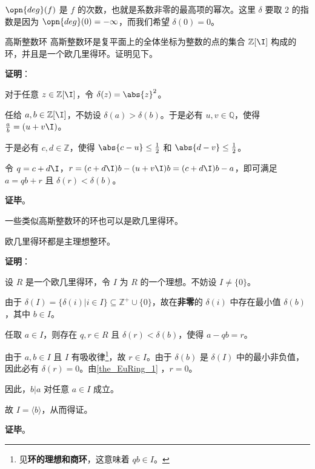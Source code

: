 $\opn{deg}(f)$ 是 $f$ 的次数，也就是系数非零的最高项的幂次。这里 $\delta$ 要取 $2$ 的指数是因为 $\opn{deg}(0)=-\infty$，而我们希望 $\delta(0)=0$。

\begin{example}{高斯整数环}
高斯整数环是复平面上的全体坐标为整数的点的集合 $\mathbb{Z}[\I]$ 构成的环，并且是一个欧几里得环。证明见下。
\end{example}

\textbf{证明}：

对于任意 $z\in\mathbb{Z}[\I]$，令 $\delta(z)=\abs{z}^2$。

任给 $a, b\in\mathbb{Z}[\I]$，不妨设 $\delta(a)>\delta(b)$。于是必有 $u, v\in\mathbb{Q}$，使得 $\frac{a}{b}=(u+v\I)$。

于是必有 $c, d\in\mathbb{Z}$，使得 $\abs{c-u}\leq\frac{1}{2}$ 和 $\abs{d-v}\leq\frac{1}{2}$。

令 $q=c+d\I$，$r=(c+d\I)b-(u+v\I)b=(c+d\I)b-a$，即可满足 $a=qb+r$ 且 $\delta(r)<\delta(b)$。

\textbf{证毕}。


一些类似高斯整数环的环也可以是欧几里得环。



\begin{example}{}

\end{example}









\begin{theorem}{}
欧几里得环都是主理想整环。
\end{theorem}

\textbf{证明}：

设 $R$ 是一个欧几里得环，令 $I$ 为 $R$ 的一个理想。不妨设 $I\not=\{0\}$。

由于 $\delta(I)=\{\delta(i)|i\in I\}\subseteq\mathbb{Z}^+\cup\{0\}$，故在\textbf{非零}的 $\delta(i)$ 中存在最小值 $\delta(b)$，其中 $b\in I$。

任取 $a\in I$，则存在 $q, r\in R$ 且 $\delta(r)<\delta(b)$，使得 $a-qb=r$。

由于 $a, b\in I$ 且 $I$ 有吸收律\footnote{见\textbf{环的理想和商环}，这意味着 $qb\in I$。}，故 $r\in I$。由于 $\delta(b)$ 是 $\delta(I)$ 中的最小非负值，因此必有 $\delta(r)=0$。由\autoref{the_EuRing_1} ，$r=0$。

因此，$b|a$ 对任意 $a\in I$ 成立。

故 $I=\langle b \rangle$，从而得证。

\textbf{证毕}。



